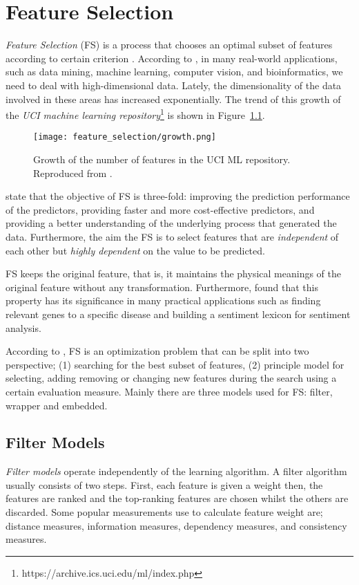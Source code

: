 \chapter{Feature Selection}
\label{ch:feature-selection}

\textit{Feature Selection} (FS) is a process that chooses an optimal subset of features according to certain criterion \citep{liu2012feature}. According to \citet{sammut2017encyclopedia}, in many real-world applications, such as data mining, machine learning, computer vision, and bioinformatics, we need to deal with high-dimensional data. Lately, the dimensionality of the data involved in these areas has increased exponentially. The trend of this growth of the \textit{UCI machine learning repository}\footnote{https://archive.ics.uci.edu/ml/index.php} is shown in Figure~\ref{fig:fs_growth}.

\begin{figure}
  \texttt{[image: feature\_selection/growth.png]}
  \caption{Growth of the number of features in the UCI ML repository. Reproduced from \citet{sammut2017encyclopedia}.}
  \label{fig:fs_growth}
\end{figure}

\citet{guyon2003introduction} state that the objective of FS is three-fold: improving the prediction performance of the predictors, providing faster and more cost-effective predictors, and providing a better understanding of the underlying process that generated the data. Furthermore, the aim the FS is to select features that are \textit{independent} of each other but \textit{highly dependent} on the value to be predicted.

FS keeps the original feature, that is, it maintains the physical meanings of the original feature without any transformation. Furthermore, \citet{masaeli2010transformation} found that this property has its significance in many practical applications such as finding relevant genes to a specific disease and building a sentiment lexicon for sentiment analysis.

According to \citet{zhao2010advancing}, FS is an optimization problem that can be split into two perspective; (1) searching for the best subset of features, (2) principle model for selecting, adding removing or changing new features during the search using a certain evaluation measure. Mainly there are three models used for FS: filter, wrapper and embedded.

\section{Filter Models}\label{sec:fs_filter}
\textit{Filter models} operate independently of the learning algorithm. A filter algorithm usually consists of two steps. First, each feature is given a weight then, the features are ranked and the top-ranking features are chosen whilst the others are discarded. Some popular measurements use to calculate feature weight are; distance measures, information measures, dependency measures, and consistency measures.


